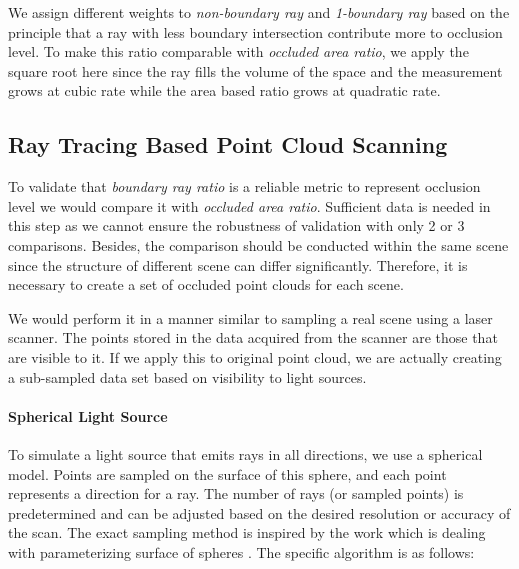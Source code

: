 \documentclass[11pt, a4paper,oneside,chapterprefix=false]{scrbook}
\begin{document}
We assign different weights to \emph{non-boundary ray} and \emph{1-boundary ray} based on the principle that a ray with less boundary intersection contribute more to occlusion level. To make this ratio comparable with \emph{occluded area ratio}, we apply the square root here since the ray fills the volume of the space and the measurement grows at cubic rate while the area based ratio grows at quadratic rate. 

\subsection{Ray Tracing Based Point Cloud Scanning} \label{subsec:ray tracing point cloud scanning}

To validate that \emph{boundary ray ratio} is a reliable metric to represent occlusion level we would compare it with \emph{occluded area ratio}. Sufficient data is needed in this step as we cannot ensure the robustness of validation with only 2 or 3 comparisons. Besides, the comparison should be conducted within the same scene since the structure of different scene can differ significantly. Therefore, it is necessary to create a set of occluded point clouds for each scene.

\vspace{10pt}

We would perform it in a manner similar to sampling a real scene using a laser scanner. The points stored in the data acquired from the scanner are those that are visible to it. If we apply this to original point cloud, we are actually creating a sub-sampled data set based on visibility to light sources. 

\paragraph{Spherical Light Source}

To simulate a light source that emits rays in all directions, we use a spherical model. Points are sampled on the surface of this sphere, and each point represents a direction for a ray. The number of rays (or sampled points) is predetermined and can be adjusted based on the desired resolution or accuracy of the scan. The exact sampling method is inspired by the work which is dealing with parameterizing surface of spheres \cite{FH:05}. The specific algorithm is as follows:
\end{document}
